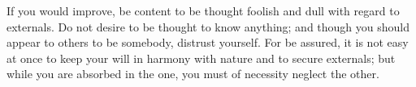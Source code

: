 If you would improve, be content to be thought foolish and dull with
regard to externals. Do not desire to be thought to know anything; and
though you should appear to others to be somebody, distrust yourself. For
be assured, it is not easy at once to keep your will in harmony with
nature and to secure externals; but while you are absorbed in the one,
you must of necessity neglect the other.
